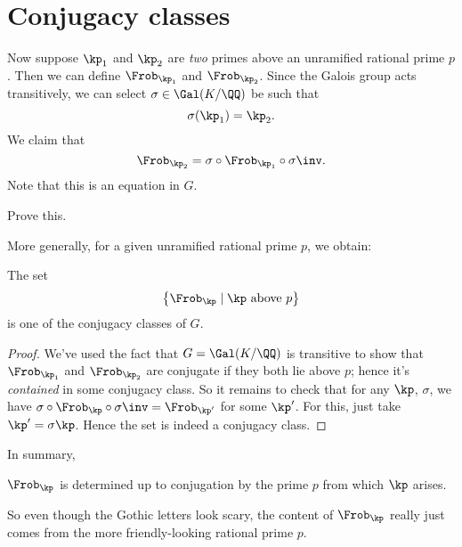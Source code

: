 \section{Conjugacy classes}
Now suppose $\kp_1$ and $\kp_2$ are \emph{two} primes above an unramified rational prime $p$.
Then we can define $\Frob_{\kp_1}$ and $\Frob_{\kp_2}$.
Since the Galois group acts transitively,
we can select $\sigma \in \Gal(K/\QQ)$ be such that
\[ \sigma(\kp_1) = \kp_2. \]
We claim that
\[
	\Frob_{\kp_2} = \sigma \circ \Frob_{\kp_1} \circ \sigma\inv.
\]
Note that this is an equation in $G$.
\begin{ques}
	Prove this.
\end{ques}

More generally, for a given unramified rational prime $p$, we obtain:
\begin{theorem}
	The set
	\[ \left\{ \Frob_\kp \mid \kp \text{ above } p \right\} \]
	is one of the conjugacy classes of $G$.
\end{theorem}
\begin{proof}
	We've used the fact that $G = \Gal(K/\QQ)$ is transitive
	to show that $\Frob_{\kp_1}$ and $\Frob_{\kp_2}$ are conjugate
	if they both lie above $p$; hence it's \emph{contained} in some
	conjugacy class.
	So it remains to check that for any $\kp$, $\sigma$,
	we have $\sigma \circ \Frob_\kp \circ \sigma\inv = \Frob_{\kp'}$
	for some $\kp'$. For this, just take $\kp' = \sigma\kp$.
	Hence the set is indeed a conjugacy class.
\end{proof}

In summary,
\begin{moral}
	$\Frob_{\kp}$ is determined up to conjugation by the prime $p$
	from which $\kp$ arises.
\end{moral}
So even though the Gothic letters look scary, the content of $\Frob_{\kp}$
really just comes from the more friendly-looking rational prime $p$.



